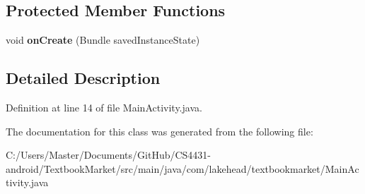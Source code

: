 \subsection*{Protected Member Functions}
\begin{DoxyCompactItemize}
\item 
\hypertarget{classcom_1_1lakehead_1_1textbookmarket_1_1_main_activity_ab5dc3cecf5c66f0c5e7ab996b6143fe4}{void {\bfseries on\-Create} (Bundle saved\-Instance\-State)}\label{classcom_1_1lakehead_1_1textbookmarket_1_1_main_activity_ab5dc3cecf5c66f0c5e7ab996b6143fe4}

\end{DoxyCompactItemize}


\subsection{Detailed Description}


Definition at line 14 of file Main\-Activity.\-java.



The documentation for this class was generated from the following file\-:\begin{DoxyCompactItemize}
\item 
C\-:/\-Users/\-Master/\-Documents/\-Git\-Hub/\-C\-S4431-\/android/\-Textbook\-Market/src/main/java/com/lakehead/textbookmarket/Main\-Activity.\-java\end{DoxyCompactItemize}
